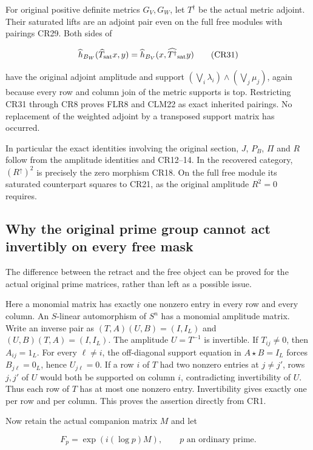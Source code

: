 \documentclass[11pt]{article}
\begin{document}
For original positive definite metrics \(G_V,G_W\), let \(T^\dagger\) be the actual metric adjoint. Their saturated lifts are an adjoint pair even on the full free modules with pairings CR29. Both sides of

\[
\widehat h_{B_W}(\widehat T_{\rm sat}x,y)
 =\widehat h_{B_V}(x,\widehat{T^\dagger}_{\rm sat}y)
\tag{CR31}
\]

have the original adjoint amplitude and support
\((\bigvee_i\lambda_i)\wedge(\bigvee_j\mu_j)\), again because every row and column join of the metric supports is top. Restricting CR31 through CR8 proves FLR8 and CLM22 as exact inherited pairings. No replacement of the weighted adjoint by a transposed support matrix has occurred.

In particular the exact identities involving the original section, \(J\), \(P_B\), \(\Pi\) and \(R\) follow from the amplitude identities and CR12--14. In the recovered category, \((R^\uparrow)^2\) is precisely the zero morphism CR18. On the full free module its saturated counterpart squares to CR21, as the original amplitude \(R^2=0\) requires.

\subsection{Why the original prime group cannot act invertibly on every free mask}

The difference between the retract and the free object can be proved for the actual original prime matrices, rather than left as a possible issue.

Here a monomial matrix has exactly one nonzero entry in every row and every column. An \(S\)-linear automorphism of \(S^n\) has a monomial amplitude matrix. Write an inverse pair as \((T,A)(U,B)=(I,I_L)\) and \((U,B)(T,A)=(I,I_L)\). The amplitude \(U=T^{-1}\) is invertible. If \(T_{ij}\ne0\), then \(A_{ij}=1_L\). For every \(\ell\ne i\), the off-diagonal support equation in \(A\star B=I_L\) forces \(B_{j\ell}=0_L\), hence \(U_{j\ell}=0\). If a row \(i\) of \(T\) had two nonzero entries at \(j\ne j'\), rows \(j,j'\) of \(U\) would both be supported on column \(i\), contradicting invertibility of \(U\). Thus each row of \(T\) has at most one nonzero entry. Invertibility gives exactly one per row and per column. This proves the assertion directly from CR1.

Now retain the actual companion matrix \(M\) and let

\[
F_p=\exp(i(\log p)M),\qquad p\text{ an ordinary prime}.
\tag{CR32}
\]
\end{document}
